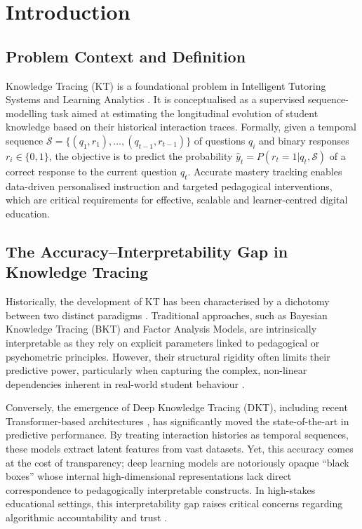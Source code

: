 \documentclass[applsci,article,submit,moreauthors,pdftex]{Definitions/mdpi}
\begin{document}


\section{Introduction} \label{sec_intro}

\subsection{Problem Context and Definition}

Knowledge Tracing (KT) \citep{corbett1994knowledge} is a foundational problem in Intelligent Tutoring Systems and Learning Analytics \citep{Romero2020}. It is conceptualised as a supervised sequence-modelling task aimed at estimating the longitudinal evolution of student knowledge based on their historical interaction traces. Formally, given a temporal sequence $\mathcal{S} = \{(q_1, r_1), \dots, (q_{t-1}, r_{t-1})\}$ of questions $q_i$ and binary responses $r_i \in \{0, 1\}$, the objective is to predict the probability $\hat{y}_t = P(r_t=1 | q_t, \mathcal{S})$ of a correct response to the current question $q_t$. Accurate mastery tracking enables data-driven personalised instruction and targeted pedagogical interventions, which are critical requirements for effective, scalable and learner-centred digital education.

\subsection{The Accuracy--Interpretability Gap in Knowledge Tracing}

Historically, the development of KT has been characterised by a dichotomy between two distinct paradigms \citep{abdelrahman2023knowledge}. Traditional approaches, such as Bayesian Knowledge Tracing (BKT) and Factor Analysis Models, are intrinsically interpretable as they rely on explicit parameters linked to pedagogical or psychometric principles. However, their structural rigidity often limits their predictive power, particularly when capturing the complex, non-linear dependencies inherent in real-world student behaviour \citep{twenty_five_years_of_bkt}.

Conversely, the emergence of Deep Knowledge Tracing (DKT), including recent Transformer-based architectures \citep{vaswani2017attention}, has significantly moved the state-of-the-art in predictive performance. By treating interaction histories as temporal sequences, these models extract latent features from vast datasets. Yet, this accuracy comes at the cost of transparency; deep learning models are notoriously opaque ``black boxes'' whose internal high-dimensional representations lack direct correspondence to pedagogically interpretable constructs. In high-stakes educational settings, this interpretability gap raises critical concerns regarding algorithmic accountability and trust \citep{Holmes2022504}.
\end{document}
